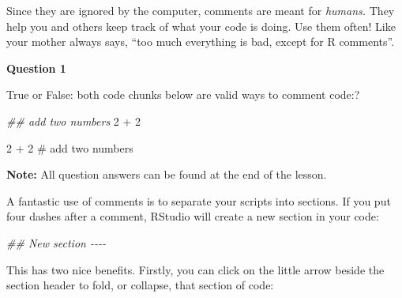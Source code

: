 \documentclass[
  letterpaper,
  DIV=11,
  numbers=noendperiod]{scrreprt}
\newenvironment{Shaded}{\begin{snugshade}}{\end{snugshade}}
\newcommand{\CommentTok}[1]{\textcolor[rgb]{0.37,0.37,0.37}{#1}}
\newcommand{\DecValTok}[1]{\textcolor[rgb]{0.68,0.00,0.00}{#1}}
\newcommand{\DocumentationTok}[1]{\textcolor[rgb]{0.37,0.37,0.37}{\textit{#1}}}
\newcommand{\SpecialCharTok}[1]{\textcolor[rgb]{0.37,0.37,0.37}{#1}}
\begin{document}
Since they are ignored by the computer, comments are meant for
\emph{humans.} They help you and others keep track of what your code is
doing. Use them often! Like your mother always says, ``too much
everything is bad, except for R comments''.

\begin{tcolorbox}[enhanced jigsaw, colframe=quarto-callout-tip-color-frame, rightrule=.15mm, opacityback=0, breakable, coltitle=black, colbacktitle=quarto-callout-tip-color!10!white, bottomrule=.15mm, leftrule=.75mm, toprule=.15mm, arc=.35mm, bottomtitle=1mm, colback=white, left=2mm, opacitybacktitle=0.6, titlerule=0mm, title=\textcolor{quarto-callout-tip-color}{\faLightbulb}\hspace{0.5em}{Practice}, toptitle=1mm]

\textbf{Question 1}

True or False: both code chunks below are valid ways to comment code:?

\begin{Shaded}
\begin{Highlighting}[]
\DocumentationTok{\#\# add two numbers}
\DecValTok{2} \SpecialCharTok{+} \DecValTok{2}
\end{Highlighting}
\end{Shaded}

\begin{Shaded}
\begin{Highlighting}[]
\DecValTok{2} \SpecialCharTok{+} \DecValTok{2} \CommentTok{\# add two numbers}
\end{Highlighting}
\end{Shaded}

\textbf{Note:} All question answers can be found at the end of the
lesson.

\end{tcolorbox}

A fantastic use of comments is to separate your scripts into sections.
If you put four dashes after a comment, RStudio will create a new
section in your code:

\begin{Shaded}
\begin{Highlighting}[]
\DocumentationTok{\#\# New section {-}{-}{-}{-}}
\end{Highlighting}
\end{Shaded}

This has two nice benefits. Firstly, you can click on the little arrow
beside the section header to fold, or collapse, that section of code:
\end{document}
